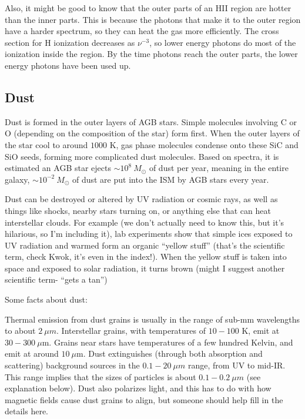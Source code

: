 Also, it might be good to know that the outer parts of an HII region are hotter than the inner 
parts.  This is because the photons that make it to the outer region have a harder spectrum, so 
they can heat the gas more efficiently.  The cross section for H ionization decreases as 
$\nu^{-3}$, so lower energy photons do most of the ionization inside the region.  By the time 
photons reach the outer parts, the lower energy photons have been used up.  

\subsection{Dust}
Dust is formed in the outer layers of AGB stars.  Simple molecules involving 
C or O (depending on the composition of the star) form first.  When the outer 
layers of the star cool to around $1000$ K, gas phase molecules condense onto 
these SiC and SiO seeds, forming more complicated dust molecules.  Based on 
spectra, it is estimated an AGB star ejects $\sim10^8\ M_{\odot}$ of dust 
per year, meaning in the entire galaxy, $\sim10^{-2}\ M_{\odot}$ of dust 
are put into the ISM by AGB stars every year.  

Dust can be destroyed or altered by UV radiation or cosmic rays, as well 
as things like shocks, nearby stars turning on, or anything else that can heat 
interstellar clouds.  For example (we don't actually need to know this, but 
it's hilarious, so I'm including it), lab experiments show that simple ices 
exposed to UV radiation and warmed form an organic ``yellow stuff'' (that's the 
scientific term, check Kwok, it's even in the index!).  When the yellow stuff 
is taken into space and exposed to solar radiation, it turns brown (might I 
suggest another scientific term- ``gets a tan'')

Some facts about dust:

Thermal emission from dust grains is usually in the range of sub-mm wavelengths 
to about $2~\mu m$. Interstellar grains, with temperatures of $10-100$ K, emit
at $30-300\ \mu$m.  Grains near stars have temperatures of a few hundred 
Kelvin, and emit at around $10\ \mu$m.  Dust extinguishes (through both absorption and scattering) background sources in the $0.1-20~\mu m$ range, from UV to mid-IR. This range implies that the sizes of particles is about $0.1-0.2~\mu m$ (see explanation below). Dust also polarizes light, and this has to do with how magnetic fields cause dust grains to align, but someone should help fill in the details here.

